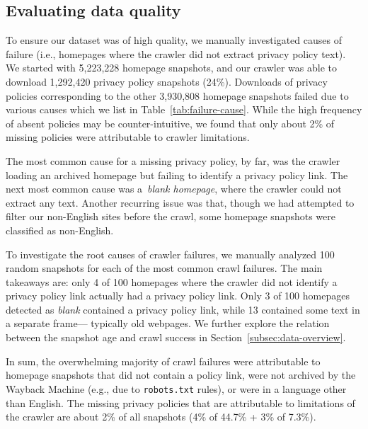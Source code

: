 \subsection{Evaluating data quality}
\label{subsec:failure-analysis}

To ensure our dataset was of high quality, we manually investigated causes of failure (i.e., homepages where the crawler did not extract privacy policy text). We started with 5,223,228 homepage snapshots, and our crawler was able to download 1,292,420 privacy policy snapshots (24\%).
Downloads of privacy policies corresponding to the other 3,930,808 homepage snapshots failed due to various causes which we list in Table~\ref{tab:failure-cause}. While the high frequency of absent policies may be counter-intuitive, we found that only about 2\% of missing policies were attributable to crawler limitations.

The most common cause for a missing privacy policy, by far, was the crawler loading an archived homepage but failing to identify a privacy policy link.
The next most common cause was a~\emph{blank homepage}, where the crawler could not extract any text. Another recurring issue was that, though we had attempted to filter our non-English sites before the crawl, some homepage snapshots were classified as non-English.

To investigate the root causes of crawler failures, we manually analyzed 100 random snapshots for each of the most common crawl failures.
The main takeaways are:
only 4 of 100 homepages where the crawler did not identify a privacy policy link actually had a privacy policy link. Only 3 of 100 homepages detected as \emph{blank} contained a privacy policy link, while 13 contained some text in a separate frame--- typically old webpages. We further explore the relation between the snapshot age and crawl success in 
Section~\ref{subsec:data-overview}.

In sum, the overwhelming majority of crawl failures were attributable to homepage snapshots that did not contain a policy link, were not archived by the Wayback Machine (e.g., due to \texttt{robots.txt} rules), or were in a language other than English. The missing privacy policies that are attributable to limitations of the crawler are about 2\% of all snapshots (4\% of 44.7\% + 3\% of 7.3\%).


